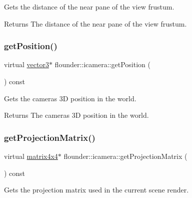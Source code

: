 Gets the distance of the near pane of the view frustum. 

\begin{DoxyReturn}{Returns}
The distance of the near pane of the view frustum. 
\end{DoxyReturn}
\mbox{\label{classflounder_1_1icamera_aa6639f6919b4bc30b05fc8d73bf57ab2}} 
\subsubsection{\texorpdfstring{get\+Position()}{getPosition()}}
{\footnotesize\ttfamily virtual \hyperlink{classflounder_1_1vector3}{vector3}$\ast$ flounder\+::icamera\+::get\+Position (\begin{DoxyParamCaption}{ }\end{DoxyParamCaption}) const\hspace{0.3cm}{\ttfamily [pure virtual]}}



Gets the cameras 3D position in the world. 

\begin{DoxyReturn}{Returns}
The cameras 3D position in the world. 
\end{DoxyReturn}
\mbox{\label{classflounder_1_1icamera_a271f2b8ade572d193b79abcd8a325b89}} 
\subsubsection{\texorpdfstring{get\+Projection\+Matrix()}{getProjectionMatrix()}}
{\footnotesize\ttfamily virtual \hyperlink{classflounder_1_1matrix4x4}{matrix4x4}$\ast$ flounder\+::icamera\+::get\+Projection\+Matrix (\begin{DoxyParamCaption}{ }\end{DoxyParamCaption}) const\hspace{0.3cm}{\ttfamily [pure virtual]}}



Gets the projection matrix used in the current scene render. 

